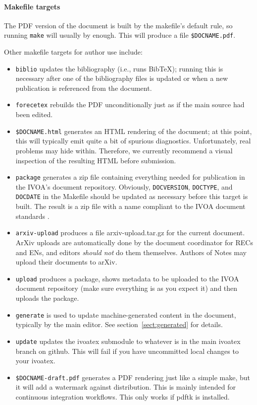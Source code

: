 \documentclass[11pt,a4paper]{ivoa}
\newcommand{\BibTeX}{BibTeX}
\begin{document}
\paragraph{Makefile targets}

The PDF version of the document is built by the makefile's default rule,
so running \texttt{make} will usually by enough.  This will produce a
file \texttt{\$DOCNAME.pdf}.

Other makefile targets for author use include:

\begin{itemize}
\item \texttt{biblio} updates the bibliography (i.e., runs \BibTeX);
running this is necessary after one of the bibliography files is updated
or when a new publication is referenced from the document.
\item \texttt{forecetex} rebuilds the PDF unconditionally just as if the
main source had been edited.
\item \texttt{\$DOCNAME.html} generates an HTML rendering of the
document; at this point, this will typically emit quite a bit of
spurious diagnostics.  Unfortunately, real problems may hide within.  
Therefore, we currently recommend a visual inspection of the resulting
HTML before submission.
\item \texttt{package} generates a zip file containing everything needed
for publication in the IVOA's document repository.   Obviously, 
\texttt{DOCVERSION}, \texttt{DOCTYPE}, and \texttt{DOCDATE} in the
Makefile should be updated as necessary before this target is built.
The result is a zip file with a name compliant to the IVOA document
standards \citep{2017ivoa.spec.0517D}.
\item \texttt{arxiv-upload}  produces a file arxiv-upload.tar.gz for
the current document.  ArXiv uploads are automatically done by the
document coordinator for RECs and ENs, and editors \emph{should not} do
them themselves.  Authors of Notes may upload their documents to arXiv.
\item \texttt{upload} produces a package, shows metadata to be uploaded to the
IVOA document repository (make sure everything is as you expect it) and
then uploads the package.
\item \texttt{generate} is used to update machine-generated content in
the document, typically by the main editor.  See
section~\ref{sect:generated} for details.
\item \texttt{update} updates the ivoatex submodule to whatever is in
the main ivoatex branch on github.  This will fail if you have
uncommitted local changes to your ivoatex.
\item \texttt{\$DOCNAME-draft.pdf} generates a PDF rendering just like a
simple make, but it will add a watermark against distribution.  This is
mainly intended for continuous integration workflows.  This only works
if pdftk is installed.
\end{itemize}
\end{document}
